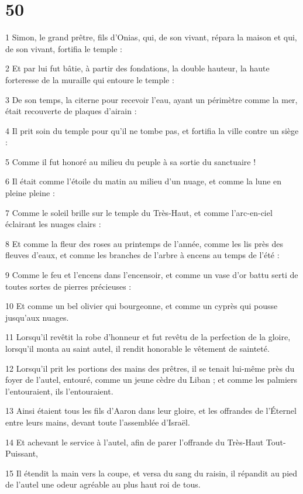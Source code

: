 \chapter{50}

\par 1 Simon, le grand prêtre, fils d'Onias, qui, de son vivant, répara la maison et qui, de son vivant, fortifia le temple :
\par 2 Et par lui fut bâtie, à partir des fondations, la double hauteur, la haute forteresse de la muraille qui entoure le temple :
\par 3 De son temps, la citerne pour recevoir l'eau, ayant un périmètre comme la mer, était recouverte de plaques d'airain :
\par 4 Il prit soin du temple pour qu'il ne tombe pas, et fortifia la ville contre un siège :
\par 5 Comme il fut honoré au milieu du peuple à sa sortie du sanctuaire !
\par 6 Il était comme l'étoile du matin au milieu d'un nuage, et comme la lune en pleine pleine :
\par 7 Comme le soleil brille sur le temple du Très-Haut, et comme l'arc-en-ciel éclairant les nuages ​​clairs :
\par 8 Et comme la fleur des roses au printemps de l'année, comme les lis près des fleuves d'eaux, et comme les branches de l'arbre à encens au temps de l'été :
\par 9 Comme le feu et l'encens dans l'encensoir, et comme un vase d'or battu serti de toutes sortes de pierres précieuses :
\par 10 Et comme un bel olivier qui bourgeonne, et comme un cyprès qui pousse jusqu'aux nuages.
\par 11 Lorsqu'il revêtit la robe d'honneur et fut revêtu de la perfection de la gloire, lorsqu'il monta au saint autel, il rendit honorable le vêtement de sainteté.
\par 12 Lorsqu'il prit les portions des mains des prêtres, il se tenait lui-même près du foyer de l'autel, entouré, comme un jeune cèdre du Liban ; et comme les palmiers l'entouraient, ils l'entouraient.
\par 13 Ainsi étaient tous les fils d'Aaron dans leur gloire, et les offrandes de l'Éternel entre leurs mains, devant toute l'assemblée d'Israël.
\par 14 Et achevant le service à l'autel, afin de parer l'offrande du Très-Haut Tout-Puissant,
\par 15 Il étendit la main vers la coupe, et versa du sang du raisin, il répandit au pied de l'autel une odeur agréable au plus haut roi de tous.
